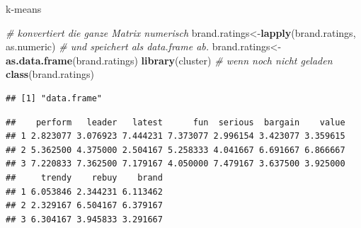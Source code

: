 \documentclass[12pt,ngerman,a4paper,ignorenonframetext,]{beamer}
\newenvironment{Shaded}{\begin{snugshade}}{\end{snugshade}}
\newcommand{\CommentTok}[1]{\textcolor[rgb]{0.56,0.35,0.01}{\textit{#1}}}
\newcommand{\DataTypeTok}[1]{\textcolor[rgb]{0.13,0.29,0.53}{#1}}
\newcommand{\DecValTok}[1]{\textcolor[rgb]{0.00,0.00,0.81}{#1}}
\newcommand{\KeywordTok}[1]{\textcolor[rgb]{0.13,0.29,0.53}{\textbf{#1}}}
\newcommand{\NormalTok}[1]{#1}
\newcommand{\OperatorTok}[1]{\textcolor[rgb]{0.81,0.36,0.00}{\textbf{#1}}}
\newcommand{\StringTok}[1]{\textcolor[rgb]{0.31,0.60,0.02}{#1}}
\begin{document}
\begin{frame}{k-means}
\protect\hypertarget{k-means}{}

\begin{Shaded}
\begin{Highlighting}[]
\CommentTok{# konvertiert die ganze Matrix numerisch}
\NormalTok{brand.ratings<-}\KeywordTok{lapply}\NormalTok{(brand.ratings, as.numeric) }
\CommentTok{# und speichert als data.frame ab. }
\NormalTok{brand.ratings<-}\KeywordTok{as.data.frame}\NormalTok{(brand.ratings) }
\KeywordTok{library}\NormalTok{(cluster) }\CommentTok{# wenn noch nicht geladen}
\KeywordTok{class}\NormalTok{(brand.ratings)}
\end{Highlighting}
\end{Shaded}

\begin{verbatim}
## [1] "data.frame"
\end{verbatim}

\begin{Shaded}
\end{Shaded}

\begin{verbatim}
##    perform   leader   latest      fun  serious  bargain    value
## 1 2.823077 3.076923 7.444231 7.373077 2.996154 3.423077 3.359615
## 2 5.362500 4.375000 2.504167 5.258333 4.041667 6.691667 6.866667
## 3 7.220833 7.362500 7.179167 4.050000 7.479167 3.637500 3.925000
##     trendy    rebuy    brand
## 1 6.053846 2.344231 6.113462
## 2 2.329167 6.504167 6.379167
## 3 6.304167 3.945833 3.291667
\end{verbatim}

\begin{Shaded}
\end{Shaded}

\end{frame}
\end{document}
